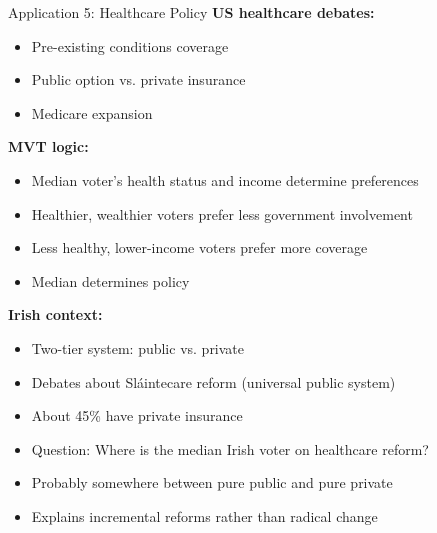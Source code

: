 \documentclass[10pt]{beamer}
\begin{document}
\begin{frame}[allowframebreaks]{Application 5: Healthcare Policy}
\textbf{US healthcare debates:}
\begin{itemize}
\item Pre-existing conditions coverage
\item Public option vs. private insurance
\item Medicare expansion
\end{itemize}



\textbf{MVT logic:}
\begin{itemize}
\item Median voter's health status and income determine preferences
\item Healthier, wealthier voters prefer less government involvement
\item Less healthy, lower-income voters prefer more coverage
\item \alert{Median determines policy}
\end{itemize}

 \framebreak   

\textbf{Irish context:}
\begin{itemize}
\item Two-tier system: public vs. private
\item Debates about Sláintecare reform (universal public system)
\item About 45\% have private insurance
\item \alert{Question:} Where is the median Irish voter on healthcare reform?
\item Probably somewhere between pure public and pure private
\item Explains incremental reforms rather than radical change
\end{itemize}
\end{frame}
\end{document}
